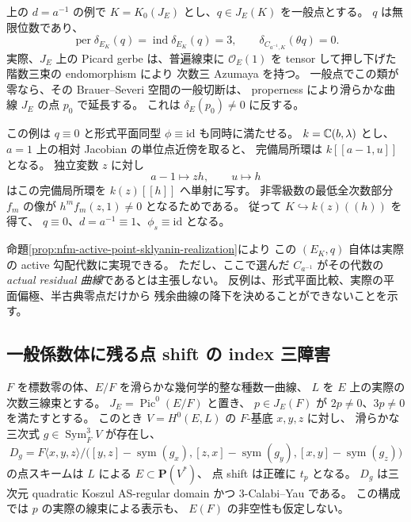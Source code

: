 \begin{remark}[無限位数と半古典零点を持つ補強]
上の $d=a^{-1}$ の例で
$K=K_0(J_E)$ とし、$q\in J_E(K)$ を一般点とする。
$q$ は無限位数であり、
\[
 \operatorname{per}\delta_{E_K}(q)
  =\operatorname{ind}\delta_{E_K}(q)=3,\qquad
 \delta_{C_{a^{-1},K}}(\theta q)=0.
\]
実際、$J_E$ 上の Picard gerbe は、普遍線束に $\mathcal O_E(1)$ を
tensor して押し下げた階数三束の endomorphism により
次数三 Azumaya を持つ。
一般点でこの類が零なら、その Brauer--Severi 空間の一般切断は、
properness により滑らかな曲線 $J_E$ の点 $p_0$ で延長する。
これは $\delta_E(p_0)\ne0$ に反する。

この例は $q\equiv0$ と形式平面同型 $\phi\equiv\mathrm{id}$ も同時に満たせる。
$k=\mathbb C(b,\lambda)$ とし、$a=1$ 上の相対 Jacobian の単位点近傍を取ると、
完備局所環は $k[[a-1,u]]$ となる。
独立変数 $z$ に対し
\[
 a-1\longmapsto zh,\qquad u\longmapsto h
\]
はこの完備局所環を $k(z)[[h]]$ へ単射に写す。
非零級数の最低全次数部分 $f_m$ の像が
$h^mf_m(z,1)\ne0$ となるためである。
従って $K\hookrightarrow k(z)((h))$ を得て、
$q\equiv0$、$d=a^{-1}\equiv1$、$\phi_s\equiv\mathrm{id}$ となる。

命題\ref{prop:nfm-active-point-sklyanin-realization}により
この $(E_K,q)$ 自体は実際の active 勾配代数に実現できる。
ただし、ここで選んだ $C_{a^{-1}}$ がその代数の
\emph{actual residual 曲線}であるとは主張しない。
反例は、形式平面比較、実際の平面偏極、半古典零点だけから
残余曲線の降下を決めることができないことを示す。
\end{remark}

\subsection{一般係数体に残る点 shift の index 三障害}

\begin{proposition}
\label{prop:nfm-active-point-sklyanin-realization}
$F$ を標数零の体、$E/F$ を滑らかな幾何学的整な種数一曲線、
$L$ を $E$ 上の実際の次数三線束とする。
$J_E=\operatorname{Pic}^0(E/F)$ と置き、
$p\in J_E(F)$ が $2p\ne0$、$3p\ne0$ を満たすとする。
このとき $V=H^0(E,L)$ の $F$-基底 $x,y,z$ に対し、
滑らかな三次式 $g\in\operatorname{Sym}^3_F V$ が存在し、
\begin{equation}\label{eq:nfm-sklyanin-arithmetic-gradient}
 D_g=F\langle x,y,z\rangle/
 \bigl([y,z]-\operatorname{sym}(g_x),
       [z,x]-\operatorname{sym}(g_y),
       [x,y]-\operatorname{sym}(g_z)\bigr)
\end{equation}
の点スキームは $L$ による $E\subset\mathbf P(V^*)$、
点 shift は正確に $t_p$ となる。
$D_g$ は三次元 quadratic Koszul AS-regular domain かつ
$3$-Calabi--Yau である。
この構成では $p$ の実際の線束による表示も、
$E(F)$ の非空性も仮定しない。
\end{proposition}

